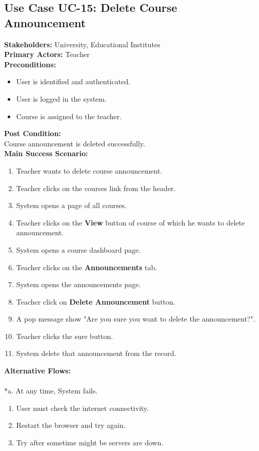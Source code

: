 \subsection{Use Case UC-15: Delete Course Announcement}
\textbf{Stakeholders: } University, Educational Institutes \\
\textbf{Primary Actors: }Teacher \\
\textbf{Preconditions:}
\begin{itemize}
\item User is identified and authenticated.
\item User is logged in the system.
\item Course is assigned to the teacher.
\end{itemize}
\textbf{Post Condition: }\\
Course announcement is deleted successfully.\\
\textbf{Main Success Scenario:}
\begin{enumerate}
\item Teacher wants to delete course announcement.
\item Teacher clicks on the courses link from the header.
\item System opens a page of all courses.
\item Teacher clicks on the \textbf{View} button of course of which he wants to delete announcement.
\item System opens a course dashboard page.
\item Teacher clicks on the \textbf{Announcements} tab.
\item System opens the announcements page.
\item Teacher click on \textbf{Delete Announcement} button.
\item A pop message show "Are you sure you want to delete the announcement?".
\item Teacher clicks the sure button.
\item System delete that announcement from the record.
\end{enumerate}
\textbf{Alternative Flows:}\\
\\
*a. At any time, System fails.
\begin{enumerate}
\item User must check the internet connectivity.
\item Restart the browser and try again.
\item Try after sometime might be servers are down.
\end{enumerate}
